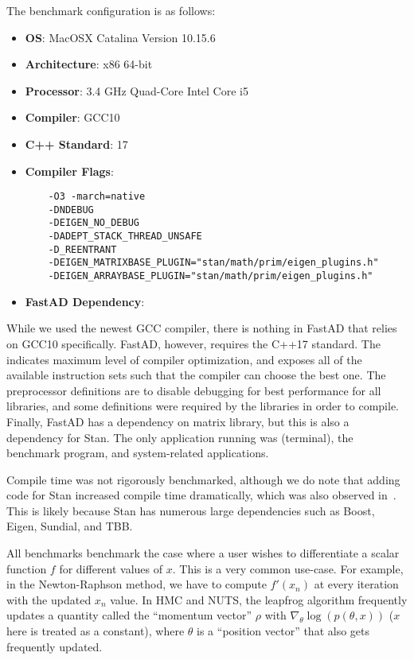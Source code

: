 The benchmark configuration is as follows:
\begin{itemize}
    \item \textbf{OS}: MacOSX Catalina Version 10.15.6 
    \item \textbf{Architecture}: x86 64-bit
    \item \textbf{Processor}: 3.4 GHz Quad-Core Intel Core i5
    \item \textbf{Compiler}: GCC10
    \item \textbf{C++ Standard}: 17
    \item \textbf{Compiler Flags}: 
\begin{verbatim}
    -O3 -march=native 
    -DNDEBUG 
    -DEIGEN_NO_DEBUG 
    -DADEPT_STACK_THREAD_UNSAFE 
    -D_REENTRANT 
    -DEIGEN_MATRIXBASE_PLUGIN="stan/math/prim/eigen_plugins.h" 
    -DEIGEN_ARRAYBASE_PLUGIN="stan/math/prim/eigen_plugins.h"
\end{verbatim}
    \item \textbf{FastAD Dependency}: 
\end{itemize}
While we used the newest GCC compiler, there is nothing in FastAD that relies on GCC10 specifically.
FastAD, however, requires the C++17 standard.
The  indicates maximum level of compiler optimization,
and  exposes all of the available instruction sets 
such that the compiler can choose the best one.
The preprocessor definitions are to disable debugging
for best performance for all libraries, and some definitions were required by the libraries in order to compile.
Finally, FastAD has a dependency on  matrix library,
but this is also a dependency for Stan.
The only application running was  (terminal),
the benchmark program, and system-related applications.

Compile time was not rigorously benchmarked, 
although we do note that adding code for Stan
increased compile time dramatically, which was also observed in~\cite{carpenter:2015}.
This is likely because Stan has numerous large dependencies such as Boost, Eigen, Sundial, and TBB.\@

All benchmarks benchmark the case where a user wishes to differentiate
a scalar function $f$ for different values of $x$.
This is a very common use-case.
For example, in the Newton-Raphson method,
we have to compute $f'(x_n)$ at every iteration with the updated $x_n$ value.
In HMC and NUTS, the leapfrog algorithm frequently
updates a quantity called the ``momentum vector'' $\rho$ 
with $\nabla_\theta \log(p(\theta, x))$ ($x$ here is treated as a constant),
where $\theta$ is a ``position vector'' that also gets frequently updated.

